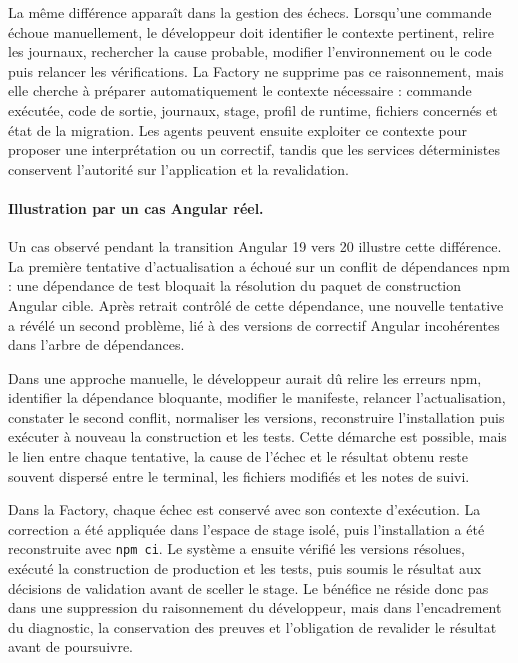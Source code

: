 La même différence apparaît dans la gestion des échecs. Lorsqu'une commande échoue manuellement, le développeur doit identifier le contexte pertinent, relire les journaux, rechercher la cause probable, modifier l'environnement ou le code puis relancer les vérifications. La Factory ne supprime pas ce raisonnement, mais elle cherche à préparer automatiquement le contexte nécessaire : commande exécutée, code de sortie, journaux, stage, profil de runtime, fichiers concernés et état de la migration. Les agents peuvent ensuite exploiter ce contexte pour proposer une interprétation ou un correctif, tandis que les services déterministes conservent l'autorité sur l'application et la revalidation.

\paragraph{Illustration par un cas Angular réel.}

Un cas observé pendant la transition Angular 19 vers 20 illustre cette différence. La première tentative d'actualisation a échoué sur un conflit de dépendances npm : une dépendance de test bloquait la résolution du paquet de construction Angular cible. Après retrait contrôlé de cette dépendance, une nouvelle tentative a révélé un second problème, lié à des versions de correctif Angular incohérentes dans l'arbre de dépendances.

Dans une approche manuelle, le développeur aurait dû relire les erreurs npm, identifier la dépendance bloquante, modifier le manifeste, relancer l'actualisation, constater le second conflit, normaliser les versions, reconstruire l'installation puis exécuter à nouveau la construction et les tests. Cette démarche est possible, mais le lien entre chaque tentative, la cause de l'échec et le résultat obtenu reste souvent dispersé entre le terminal, les fichiers modifiés et les notes de suivi.

Dans la Factory, chaque échec est conservé avec son contexte d'exécution. La correction a été appliquée dans l'espace de stage isolé, puis l'installation a été reconstruite avec \texttt{npm ci}. Le système a ensuite vérifié les versions résolues, exécuté la construction de production et les tests, puis soumis le résultat aux décisions de validation avant de sceller le stage. Le bénéfice ne réside donc pas dans une suppression du raisonnement du développeur, mais dans l'encadrement du diagnostic, la conservation des preuves et l'obligation de revalider le résultat avant de poursuivre.

